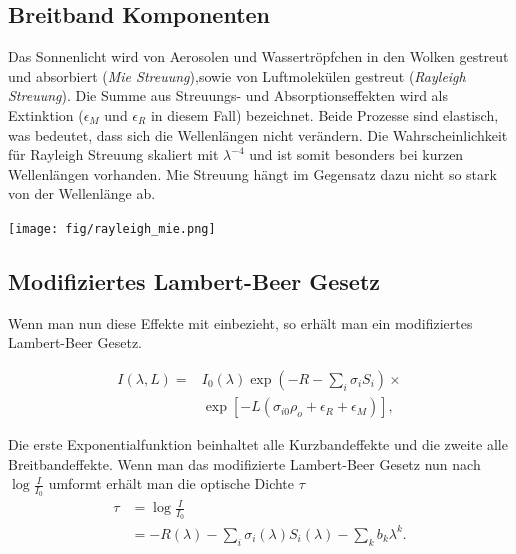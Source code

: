 \documentclass[12pt, a4paper, bibliography=totoc]{scrartcl}
\begin{document}
\begin{multicols}{2}
\subsection{Breitband Komponenten}

Das Sonnenlicht wird von Aerosolen und Wassertröpfchen in den Wolken gestreut und absorbiert (\textit{Mie Streuung}),sowie von Luftmolekülen gestreut (\textit{Rayleigh Streuung}).
Die Summe aus Streuungs- und Absorptionseffekten wird als Extinktion ($\epsilon_M$ und $\epsilon_R$ in diesem Fall) bezeichnet.
Beide Prozesse sind elastisch, was bedeutet, dass sich die Wellenlängen nicht verändern.
Die Wahrscheinlichkeit für Rayleigh Streuung skaliert mit $\lambda^{-4}$ und ist somit besonders bei kurzen Wellenlängen vorhanden.
Mie Streuung hängt im Gegensatz dazu nicht so stark von der Wellenlänge ab.

\begin{center}
    \texttt{[image: fig/rayleigh\_mie.png]}
    \label{fig:rayleigh_mie}
\end{center}



\subsection{Modifiziertes Lambert-Beer Gesetz}\label{ssec:mod_lamb-beer_law}

Wenn man nun diese Effekte mit einbezieht, so erhält man ein modifiziertes Lambert-Beer Gesetz.

\begin{align*}
    I(\lambda, L) = & I_0 (\lambda) \exp \left( -R - \sum_i \sigma_i
    S_i \right) \times \\
    & \exp \left[ - L \left( \sigma_{i0} \rho_o + \epsilon_R + \epsilon_M \right) \right], \label{eq:mod_lambert_beer_law}
\end{align*}

Die erste Exponentialfunktion beinhaltet alle Kurzbandeffekte und die zweite alle Breitbandeffekte.
Wenn man das modifizierte Lambert-Beer Gesetz nun nach $\log \frac{I}{I_0}$ umformt erhält man die optische Dichte $\tau$
\begin{align}
\tau &= \log \frac{I}{I_0} \\
    &= - R(\lambda) - \sum_i \sigma_i (\lambda) S_i (\lambda) - \sum_k b_k \lambda^k.\label{eq:optical_density}
\end{align}


\end{multicols}
\end{document}
